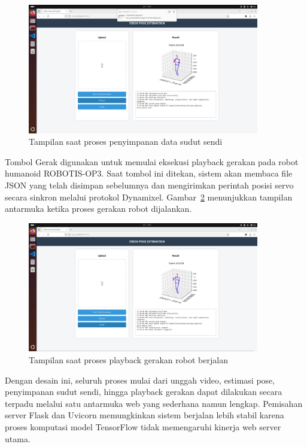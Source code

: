 \begin{figure}[H]
    \centering
    \includegraphics[width=0.9\textwidth]{images/tampilan6.jpeg}
    \caption{Tampilan saat proses penyimpanan data sudut sendi}
    \label{fig:simpan_pose}
\end{figure}

Tombol Gerak digunakan untuk memulai eksekusi playback gerakan pada robot humanoid ROBOTIS-OP3. Saat tombol ini ditekan, sistem akan membaca file JSON yang telah disimpan sebelumnya dan mengirimkan perintah posisi servo secara sinkron melalui protokol Dynamixel. Gambar~\ref{fig:gerakan_robot} menunjukkan tampilan antarmuka ketika proses gerakan robot dijalankan.

\begin{figure}[H]
    \centering
    \includegraphics[width=0.9\textwidth]{images/tampilan7.jpeg}
    \caption{Tampilan saat proses playback gerakan robot berjalan}
    \label{fig:gerakan_robot}
\end{figure}

Dengan desain ini, seluruh proses mulai dari unggah video, estimasi pose, penyimpanan sudut sendi, hingga playback gerakan dapat dilakukan secara terpadu melalui satu antarmuka web yang sederhana namun lengkap. Pemisahan server Flask dan Uvicorn memungkinkan sistem berjalan lebih stabil karena proses komputasi model TensorFlow tidak memengaruhi kinerja web server utama.

